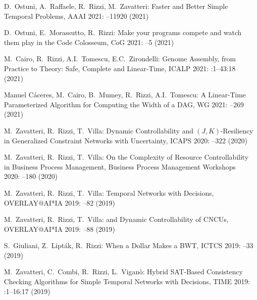 
\begin{etaremune}

\item {\sc D.~Ostuni, A.~Raffaele, R.~Rizzi, M.~Zavatteri:}
   \newblock Faster and Better Simple Temporal Problems,
   \newblock  AAAI 2021:
   --11920 (2021)
   
\item {\sc D.~Ostuni, E.~Morassutto, R.~Rizzi:}
   \newblock Make your programs compete and watch them play in the Code Colosseum,
   \newblock  CoG 2021:
   --5 (2021)
   
\item {\sc M.~Cairo, R.~Rizzi, A.I.~Tomescu, E.C.~Zirondelli:}
   \newblock Genome Assembly, from Practice to Theory: Safe, Complete and Linear-Time,
   \newblock  ICALP 2021:
   :1--43:18 (2021)
   
\item {\sc Manuel Cáceres, M.~Cairo, B.~Mumey, R.~Rizzi, A.I.~Tomescu:}
   \newblock A Linear-Time Parameterized Algorithm for Computing the Width of a DAG,
   \newblock  WG 2021:
   --269 (2021)
   
\item {\sc M.~Zavatteri, R.~Rizzi, T.~Villa:}
   \newblock Dynamic Controllability and $(J,K)$-Resiliency in Generalized Constraint Networks with Uncertainty,
   \newblock  ICAPS 2020:
   --322 (2020)
   
\item {\sc M.~Zavatteri, R.~Rizzi, T.~Villa:}
   \newblock On the Complexity of Resource Controllability in Business Process Management,
   \newblock  Business Process Management Workshops 2020:
   --180 (2020)
   
\item {\sc M.~Zavatteri, R.~Rizzi, T.~Villa:}
   \newblock Temporal Networks with Decisions,
   \newblock  OVERLAY@AI*IA 2019:
   --82 (2019)
   
\item {\sc M.~Zavatteri, R.~Rizzi, T.~Villa:}
   \newblock  and Dynamic Controllability of CNCUs,
   \newblock  OVERLAY@AI*IA 2019:
   --88 (2019)
   
 \item {\sc S.~Giuliani, Z.~Lipták, R.~Rizzi:}
   \newblock  When a Dollar Makes a BWT,
   \newblock  ICTCS 2019:
   --33 (2019)
  
\item {\sc M.~Zavatteri, C.~Combi, R.~Rizzi, L.~Viganò:}
   \newblock Hybrid SAT-Based Consistency Checking Algorithms for Simple Temporal Networks with Decisions,
   \newblock  TIME 2019:
   :1--16:17 (2019)
  

\end{etaremune}
